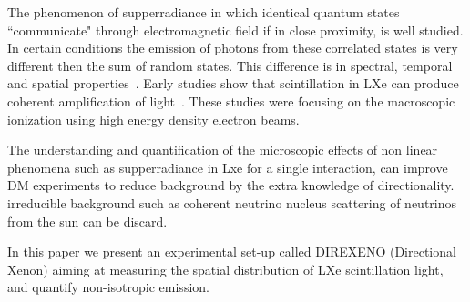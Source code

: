 The phenomenon of supperradiance in which identical quantum states ``communicate" through electromagnetic field if in close proximity, is well studied. In certain conditions the emission of photons from these correlated states is very different then the sum of random states. This difference is in spectral, temporal and spatial properties~\cite{DickeSR,GROSS1982301}. Early studies show that scintillation in LXe can produce coherent amplification of light~\cite{BasovSRTheory,MiesSRExp}. These studies were focusing on the macroscopic ionization using high energy density electron beams. 

The understanding and quantification of the microscopic effects of non linear phenomena such as supperradiance in Lxe for a single interaction, can improve DM experiments to reduce background by the extra knowledge of directionality. irreducible background such as coherent neutrino nucleus scattering of neutrinos from the sun can be discard.

In this paper we present an experimental set-up called DIREXENO (Directional Xenon) aiming at measuring the spatial distribution of LXe scintillation light, and quantify non-isotropic emission.   